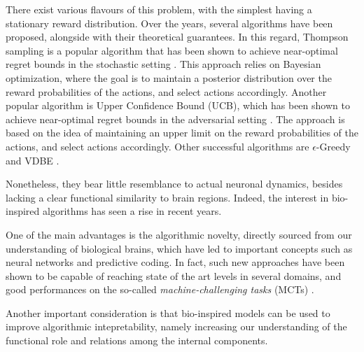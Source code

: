 There exist various flavours of this problem, with the simplest having a stationary reward distribution.
Over the years, several algorithms have been proposed, alongside with their theoretical guarantees.
In this regard, Thompson sampling is a popular algorithm that has been shown to achieve near-optimal regret bounds in the stochastic setting \cite{agrawalAnalysisThompsonSampling2012, kaufmannThompsonSamplingAsymptotically2012}.
This approach relies on Bayesian optimization, where the goal is to maintain a posterior distribution over the reward probabilities of the actions, and select actions accordingly.
Another popular algorithm is Upper Confidence Bound (UCB), which has been shown to achieve near-optimal regret bounds in the adversarial setting \cite{auerFinitetimeAnalysisMultiarmed2002}.
The approach is based on the idea of maintaining an upper limit on the reward probabilities of the actions, and select actions accordingly.
Other successful algorithms are $\epsilon$-Greedy and VDBE \cite{gittinsBanditProcessesDynamic1979, banMultifacetContextualBandits2021, tokicAdaptiveEGreedyExploration2010, tokicValueDifferenceBasedExploration2011}.

Nonetheless, they bear little resemblance to actual neuronal dynamics, besides lacking a clear functional similarity to brain regions.
Indeed, the interest in bio-inspired algorithms has seen a rise in recent years.

One of the main advantages is the algorithmic novelty, directly sourced from our understanding of biological brains, which have led to important concepts such as neural networks and predictive coding. In fact, such new approaches have been shown to be capable of reaching state of the art levels in several domains, and good performances on the so-called \textit{machine-challenging tasks} (MCTs) \cite{schmidgallBraininspiredLearningArtificial2024, hassabisNeuroscienceInspiredArtificialIntelligence2017, leeBraininspiredPredictiveCoding2022}.

Another important consideration is that bio-inspired models can be used to improve algorithmic intepretability, namely increasing our understanding of the functional role and relations among the internal components.

